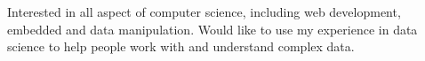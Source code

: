 

\begin{cvparagraph}


Interested in all aspect of computer science, including web development, embedded and data manipulation. Would like to use my experience in data science to help people work with and understand complex data.

\end{cvparagraph}
\vspace{-0.2cm}